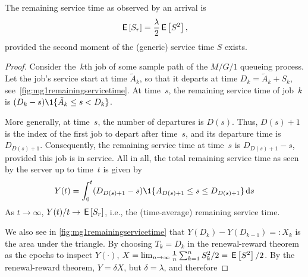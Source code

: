 \documentclass[queueing-book.tex]{subfiles}
\begin{document}
\begin{theorem}
The remaining service time as observed by an arrival is
\begin{equation*}
\,\mathsf{E}\left[S_r\right] = \frac{\lambda}2 \,\mathsf{E}\left[S^2\right],
\end{equation*}
provided the second moment of the (generic) service time $S$ exists.
\end{theorem}
\begin{proof}
Consider the~$k$th job of some sample path of the $M/G/1$ queueing process.
Let the job's service start at time $\tilde A_k$, so that it departs at time $D_k=\tilde A_k + S_k$, see~\cref{fig:mg1remainingservicetime}.
At time~$s$,  the remaining service time of job~$k$ is
$(D_k-s)\1{\tilde A_k \leq s < D_k}$.
\begin{marginfigure}
 \caption{Remaining service time.}
 \label{fig:mg1remainingservicetime}
\end{marginfigure}
More generally, at time~$s$, the number of departures is $D(s)$.
Thus, $D(s)+1$ is the index of the first job to depart after time~$s$, and its departure time is $D_{D(s)+1}$.
Consequently, the remaining service time at time~$s$ is $D_{D(s)+1}-s$, provided this job is in service.
All in all, the total remaining service time as seen by the server up to time~$t$ is given by
 \begin{equation*}
 Y(t) = \int_0^t (D_{D(s)+1}-s)\1{A_{D(s)+1} \leq s \leq D_{D(s)+1}} \d s
 \end{equation*}
As $t \to \infty$, $Y(t)/t \to \,\mathsf{E}\left[S_{r}\right]$, i.e., the  (time-average) remaining service time.

 We also see in \cref{fig:mg1remainingservicetime} that $Y(D_k) - Y(D_{k-1}) =:X_k$ is the area under the triangle.
 By choosing $T_k=D_k$ in the renewal-reward theorem as the epochs to inspect $Y(\cdot)$, $X=\lim_{n\to\infty} \frac{1}{n}\sum_{k=1}^n S_k^2/ 2 = \,\mathsf{E}\left[S^2\right]/2$.
 By the renewal-reward theorem, $Y=\delta X$, but $\delta = \lambda$, and therefore
\end{proof}
\end{document}
